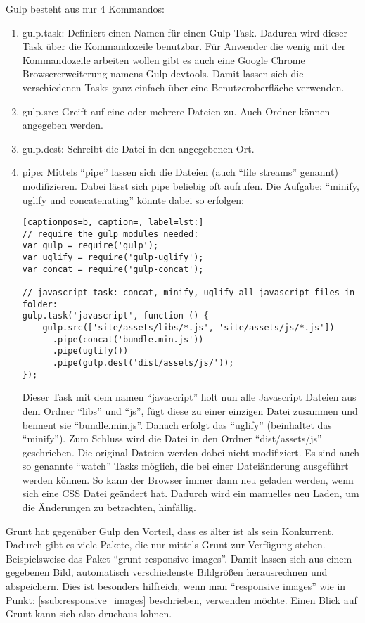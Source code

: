 		Gulp besteht aus nur 4 Kommandos:
		\begin{enumerate}
			\item gulp.task: Definiert einen Namen für einen Gulp Task. Dadurch wird dieser Task über die Kommandozeile benutzbar. Für Anwender die wenig mit der Kommandozeile arbeiten wollen gibt es auch eine Google Chrome Browsererweiterung namens Gulp-devtools. Damit lassen sich die verschiedenen Tasks ganz einfach über eine Benutzeroberfläche verwenden.
			\item gulp.src: Greift auf eine oder mehrere Dateien zu. Auch Ordner können angegeben werden.
			\item gulp.dest: Schreibt die Datei in den angegebenen Ort.
			\item pipe: Mittels "`pipe"' lassen sich die Dateien (auch "`file streams"'  genannt) modifizieren. Dabei lässt sich pipe beliebig oft aufrufen. Die Aufgabe: "`minify, uglify und concatenating"' könnte dabei so erfolgen:
			\begin{lstlisting}[captionpos=b, caption=, label=lst:]
// require the gulp modules needed:
var gulp = require('gulp');
var uglify = require('gulp-uglify');
var concat = require('gulp-concat');

// javascript task: concat, minify, uglify all javascript files in folder:
gulp.task('javascript', function () {
    gulp.src(['site/assets/libs/*.js', 'site/assets/js/*.js'])
      .pipe(concat('bundle.min.js')) 
      .pipe(uglify())
      .pipe(gulp.dest('dist/assets/js/'));
});
			\end{lstlisting}
			Dieser Task mit dem namen "`javascript"' holt nun alle Javascript Dateien aus dem Ordner "`libs"' und "`js"', fügt diese zu einer einzigen Datei zusammen und bennent sie "`bundle.min.js"'. Danach erfolgt das "`uglify"' (beinhaltet das "`minify"'). Zum Schluss wird die Datei in den Ordner "`dist/assets/js"' geschrieben. Die original Dateien werden dabei nicht modifiziert. Es sind auch so genannte "`watch"' Tasks möglich, die bei einer Dateiänderung ausgeführt werden können. So kann der Browser immer dann neu geladen werden, wenn sich eine CSS Datei geändert hat. Dadurch wird ein manuelles neu Laden, um die Änderungen zu betrachten, hinfällig.	
		\end{enumerate}

		Grunt hat gegenüber Gulp den Vorteil, dass es älter ist als sein Konkurrent. Dadurch gibt es viele Pakete, die nur mittels Grunt zur Verfügung stehen. Beispielsweise das Paket "`grunt-responsive-images"'. Damit lassen sich aus einem gegebenen Bild, automatisch verschiedenste Bildgrößen herausrechnen und abspeichern. Dies ist besonders hilfreich, wenn man "`responsive images"' wie in Punkt: \ref{ssub:responsive_images} beschrieben, verwenden möchte. Einen Blick auf Grunt kann sich also druchaus lohnen.\\
		\pagebreak
		
